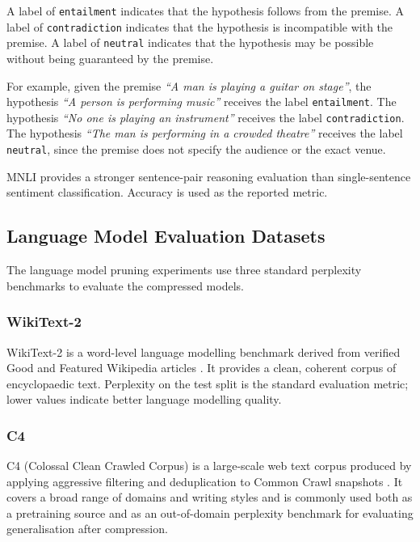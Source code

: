 A label of \texttt{entailment} indicates that the hypothesis follows from the premise. A label of \texttt{contradiction} indicates that the hypothesis is incompatible with the premise. A label of \texttt{neutral} indicates that the hypothesis may be possible without being guaranteed by the premise.

For example, given the premise \textit{``A man is playing a guitar on stage''}, the hypothesis \textit{``A person is performing music''} receives the label \texttt{entailment}. The hypothesis \textit{``No one is playing an instrument''} receives the label \texttt{contradiction}. The hypothesis \textit{``The man is performing in a crowded theatre''} receives the label \texttt{neutral}, since the premise does not specify the audience or the exact venue.

MNLI provides a stronger sentence-pair reasoning evaluation than single-sentence sentiment classification. Accuracy is used as the reported metric.

\subsection{Language Model Evaluation Datasets}
\label{subsec:lm-datasets}

The language model pruning experiments use three standard perplexity benchmarks to evaluate the compressed models.

\subsubsection{WikiText-2}
WikiText-2 is a word-level language modelling benchmark derived from verified Good and Featured Wikipedia articles \citep{merity2017pointer}. It provides a clean, coherent corpus of encyclopaedic text. Perplexity on the test split is the standard evaluation metric; lower values indicate better language modelling quality.

\subsubsection{C4}
C4 (Colossal Clean Crawled Corpus) is a large-scale web text corpus produced by applying aggressive filtering and deduplication to Common Crawl snapshots \citep{raffel2020exploring}. It covers a broad range of domains and writing styles and is commonly used both as a pretraining source and as an out-of-domain perplexity benchmark for evaluating generalisation after compression.

